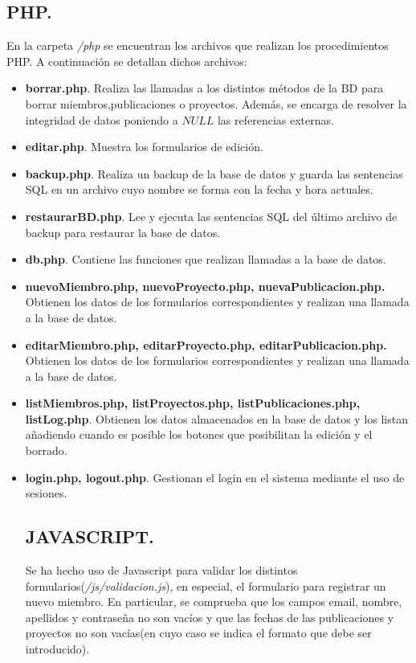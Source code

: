 \documentclass[a4paper, 11pt]{article} %
\begin{document}
\subsection{PHP.}
En la carpeta \emph{/php} se encuentran los archivos que realizan los procedimientos PHP. A continuación se detallan dichos archivos:
\begin{itemize}
	\item \textbf{borrar.php}. Realiza las llamadas a los distintos métodos de la BD para borrar miembros,publicaciones o proyectos. Además, se encarga de resolver la integridad de datos poniendo a $NULL$ las referencias externas. 
	\item \textbf{editar.php}. Muestra los formularios de edición.
	\item \textbf{backup.php}. Realiza un backup de la base de datos y guarda las sentencias SQL en un archivo cuyo nombre se forma con la fecha y hora actuales. 
	\item \textbf{restaurarBD.php}. Lee y ejecuta las sentencias SQL del último archivo de backup para restaurar la base de datos. 
	\item \textbf{db.php}. Contiene las funciones que realizan llamadas a la base de datos.
	\item \textbf{nuevoMiembro.php, nuevoProyecto.php, nuevaPublicacion.php.} Obtienen los datos de los formularios correspondientes y realizan una llamada a la base de datos.
	\item \textbf{editarMiembro.php, editarProyecto.php, editarPublicacion.php.} Obtienen los datos de los formularios correspondientes y realizan una llamada a la base de datos.
    \item \textbf{listMiembros.php, listProyectos.php, listPublicaciones.php, listLog.php}. Obtienen los datos almacenados en la base de datos y los listan añadiendo cuando es posible los botones que posibilitan la edición y el borrado.
    \item \textbf{login.php, logout.php}. Gestionan el login en el sistema mediante el uso de sesiones.
    \subsection{JAVASCRIPT.}
    Se ha hecho uso de Javascript para validar los distintos formularios(\emph{/js/validacion.js}), en especial, el formulario
	para registrar un nuevo miembro. En particular, se comprueba que los campos email, nombre, apellidos y contraseña no son vacíos y que las fechas de las publicaciones y proyectos no son vacías(en cuyo caso se indica el formato que debe ser introducido).
\end{itemize}
\end{document}
